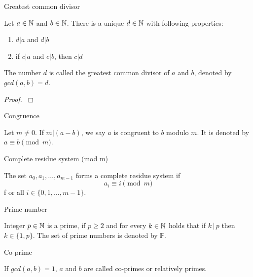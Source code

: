 \documentclass{article}
\begin{document}
\begin{theorem}
Greatest common divisor \cite{LeVeque:gcd}

Let $a \in \mathbb{N}$ and $b \in \mathbb{N}$. There is a unique $d \in \mathbb{N}$ with following properties:

\begin{enumerate}
 \item $d \vert a$ and $d \vert b$
 \item if $c \vert a$ and $c \vert b$, then $c \vert d$
\end{enumerate}

The number $d$ is called the greatest common divisor of $a$ and $b$, denoted by $gcd(a,b) = d$.

\begin{proof}
\cite{LeVeque:gcd}
\end{proof}
\end{theorem}

\begin{definition}
Congruence

Let $m\not=0$. If $m\vert(a-b)$, we say $a$ is congruent to $b$ modulo $m$. It is denoted by $a\equiv b \pmod{m}$.
\end{definition}

\begin{definition}
Complete residue system (mod m)

The set $a_0,a_1,\dots,a_{m-1}$ forms a complete residue system if
\begin{equation*}
    a_i \equiv i \pmod{m}
\end{equation*}f
or all $i\in\{0,1,\dots,m-1\}$.
\end{definition}

\begin{definition}
Prime number

Integer $p\in\mathbb{N}$ is a prime, if $p \geq 2$ and for every $k\in\mathbb{N}$ holds that if $k \,\vert\, p$ then $k\in\{1, p\}$. The set of prime numbers is denoted by $\mathbb{P}$.


\end{definition}

\begin{definition}
Co-prime

If $gcd(a,b) = 1$, $a$ and $b$ are called co-primes or relatively primes.
\end{definition}
\end{document}
